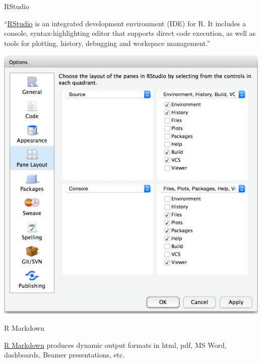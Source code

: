 \documentclass[
  8pt,
  ignorenonframetext,
  dvipsnames]{beamer}
\begin{document}
\begin{frame}{RStudio}
\protect\hypertarget{rstudio}{}

``\href{https://www.rstudio.com/products/rstudio/features/}{RStudio} is
an integrated development environment (IDE) for R. It includes a
console, syntax-highlighting editor that supports direct code execution,
as well as tools for plotting, history, debugging and workspace
management.''

\includegraphics{pane_layout.png}

\end{frame}

\begin{frame}{R Markdown}
\protect\hypertarget{r-markdown}{}

\href{https://rmarkdown.rstudio.com/}{R Markdown} produces dynamic
output formats in html, pdf, MS Word, dashboards, Beamer presentations,
etc.

\end{frame}
\end{document}
